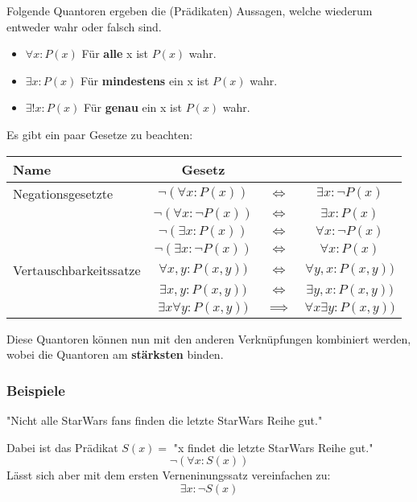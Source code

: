 \documentclass[a4paper,12pt]{article}
\begin{document}
Folgende Quantoren ergeben die (Prädikaten) Aussagen, welche wiederum entweder wahr oder falsch sind.
\begin{itemize}
  \item $\forall x : P(x)$ Für \textbf{alle} x ist $P(x)$ wahr.
  \item $\exists x : P(x)$ Für \textbf{mindestens} ein x ist $P(x)$ wahr.
  \item $\exists! x : P(x)$ Für \textbf{genau} ein x ist $P(x)$ wahr.
\end{itemize}

Es gibt ein paar Gesetze zu beachten:

\begin{tabular}{l|ccc}
  \textbf{Name} & \textbf{Gesetz} \\
  \hline
  Negationsgesetzte & \(\neg ( \forall x : P(x)) \) & $\iff$ & $\exists x : \neg P(x) $\\
   & \(\neg ( \forall x : \neg P(x))\) & $ \iff $ & $\exists x :  P(x)$  \\
   & \(\neg ( \exists x :  P(x))\) & $\iff$ & \(\forall x : \neg P(x)\)  \\   
   & \(\neg ( \exists x : \neg P(x))\) & $ \iff $ & \(\forall x :  P(x)\)  \\
  \hline
  Vertauschbarkeitssatze & \( \forall x,y : P(x, y)) \) & $\iff$ & $\forall y,x : P(x, y)) $\\
   & \( \exists x,y : P(x, y)) \) & $\iff$ & $\exists y,x : P(x, y)) $\\
   & \( \exists x \forall y : P(x, y)) \) & $\implies$ & $\forall x \exists y : P(x, y))  $\\  
  \end{tabular}

Diese Quantoren können nun mit den anderen Verknüpfungen kombiniert werden, wobei die Quantoren am \textbf{stärksten} binden.
\subsubsection{Beispiele}
"Nicht alle StarWars fans finden die letzte StarWars Reihe gut."

Dabei ist das Prädikat $S(x) = $ "x findet die letzte StarWars Reihe gut."
\begin{displaymath}
  \neg (\forall x : S(x))
\end{displaymath}
Lässt sich aber mit dem ersten Verneninungssatz vereinfachen zu:
\begin{displaymath}
  \exists x : \neg S(x)
\end{displaymath}
\end{document}
